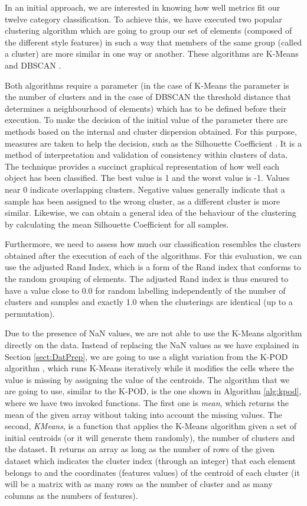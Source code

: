 In an initial approach, we are interested in knowing how well metrics fit our twelve category classification. To achieve this, we have executed two popular clustering algorithm which are going to group our set of elements (composed of the different style features) in such a way that members of the same group (called a cluster) are more similar in one way or another. These algorithms are K-Means \citep{hartigan1975clustering} and DBSCAN \citep{ester1996density}.

Both algorithms require a parameter (in the case of K-Means the parameter is the number of clusters and in the case of DBSCAN the threshold distance that determines a neighbourhood of elements) which has to be defined before their execution. To make the decision of the initial value of the parameter there are methods based on the internal and cluster dispersion obtained. For this purpose, measures are taken to help the decision, such as the Silhouette Coefficient \citep{rousseeuw1987silhouettes}. It is a method of interpretation and validation of consistency within clusters of data. The technique provides a succinct graphical representation of how well each object has been classified. The best value is 1 and the worst value is -1. Values near 0 indicate overlapping clusters. Negative values generally indicate that a sample has been assigned to the wrong cluster, as a different cluster is more similar. Likewise, we can obtain a general idea of the behaviour of the clustering by calculating the mean Silhouette Coefficient for all samples.

Furthermore, we need to assess how much our classification resembles the clusters obtained after the execution of each of the algorithms. For this evaluation, we can use the adjusted Rand Index, which is a form of the Rand index \citep{rand1971objective} that conforms to the random grouping of elements. The adjusted Rand index is thus ensured to have a value close to 0.0 for random labelling independently of the number of clusters and samples and exactly 1.0 when the clusterings are identical (up to a permutation).

Due to the presence of NaN values, we are not able to use the K-Means algorithm directly on the data. Instead of replacing the NaN values as we have explained in Section \ref{sect:DatPrep}, we are going to use a slight variation from the K-POD algorithm \citep{chi2016k}, which runs K-Means iteratively while it modifies the cells where the value is missing by assigning the value of the centroids. The algorithm that we are going to use, similar to the K-POD, is the one shown in Algorithm \ref{alg:kpod}, where we have two invoked functions. The first one is \textit{mean}, which returns the mean of the given array without taking into account the missing values. The second, \textit{KMeans}, is a function that applies the K-Means algorithm given a set of initial centroids (or it will generate them randomly), the number of clusters and the dataset. It returns an array as long as the number of rows of the given dataset which indicates the cluster index (through an integer) that each element belongs to and the coordinates (features values) of the centroid of each cluster (it will be a matrix with as many rows as the number of cluster and as many columns as the numbers of features).

